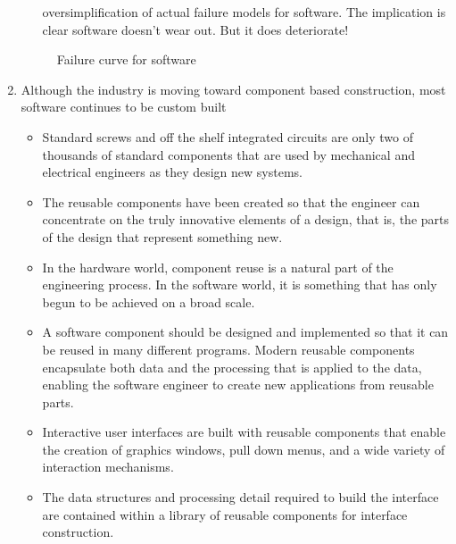 \documentclass{article}
\begin{document}
\begin{enumerate}[label=\arabic*.]
\begin{itemize}
					oversimplification of actual failure models for software.
					The implication is clear software doesn't wear out. But it does deteriorate!
			\end{itemize}
			\begin{figure}[H]
				\centering
				
				\caption{Failure curve for software}
			\end{figure}
		\item Although the industry is moving toward component based construction, most software continues to be
			custom built
		\begin{itemize}
			\item Standard screws and off the shelf integrated circuits are only two of thousands of standard
				components that are used by mechanical and electrical engineers as they design new systems.
			\item The reusable components have been created so that the engineer can concentrate on the truly
				innovative elements of a design, that is, the parts of the design that represent something new. 			\item In the hardware world, component reuse is a natural part of the engineering process.
				In the software world, it is something that has only begun to be achieved on a broad scale.
			\item A software component should be designed and implemented so that it can be reused in many
				different programs.
				Modern reusable components encapsulate both data and the processing that is applied to the
				data, enabling the software engineer to create new applications from reusable parts.
			\item Interactive user interfaces are built with reusable components that enable the creation of
				graphics windows, pull down menus, and a wide variety of interaction mechanisms.
			\item The data structures and processing detail required to build the interface are contained within
				a library of reusable components for interface construction.
		\end{itemize}
	\end{enumerate} \newpage
\end{document}
